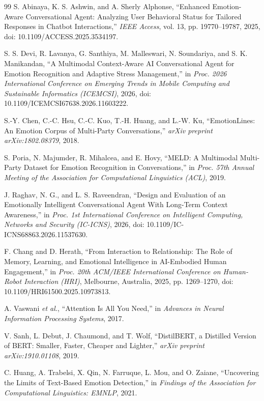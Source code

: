 \documentclass[graybox]{svmult}
\begin{document}
\begin{thebibliography}{99}
S. Abinaya, K. S. Ashwin, and A. Sherly Alphonse, ``Enhanced
Emotion-Aware Conversational Agent: Analyzing User Behavioral Status for
Tailored Responses in Chatbot Interactions,'' \textit{IEEE Access},
vol. 13, pp. 19770--19787, 2025,
doi: 10.1109/ACCESS.2025.3534197.

S. S. Devi, R. Lavanya, G. Santhiya, M. Malleswari, N. Soundariya, and
S. K. Manikandan, ``A Multimodal Context-Aware AI Conversational Agent
for Emotion Recognition and Adaptive Stress Management,'' in \textit{Proc.
2026 International Conference on Emerging Trends in Mobile Computing and
Sustainable Informatics (ICEMCSI)}, 2026,
doi: 10.1109/ICEMCSI67638.2026.11603222.

S.-Y. Chen, C.-C. Hsu, C.-C. Kuo, T.-H. Huang, and L.-W. Ku,
``EmotionLines: An Emotion Corpus of Multi-Party Conversations,''
\textit{arXiv preprint arXiv:1802.08379}, 2018.

S. Poria, N. Majumder, R. Mihalcea, and E. Hovy, ``MELD: A Multimodal
Multi-Party Dataset for Emotion Recognition in Conversations,'' in
\textit{Proc. 57th Annual Meeting of the Association for Computational
Linguistics (ACL)}, 2019.

J. Raghav, N. G., and L. S. Raveendran, ``Design and Evaluation of an
Emotionally Intelligent Conversational Agent With Long-Term Context
Awareness,'' in \textit{Proc. 1st International Conference on Intelligent
Computing, Networks and Security (IC-ICNS)}, 2026,
doi: 10.1109/IC-ICNS68863.2026.11537630.

F. Chang and D. Herath, ``From Interaction to Relationship: The Role of
Memory, Learning, and Emotional Intelligence in AI-Embodied Human
Engagement,'' in \textit{Proc. 20th ACM/IEEE International Conference on
Human-Robot Interaction (HRI)}, Melbourne, Australia, 2025,
pp. 1269--1270, doi: 10.1109/HRI61500.2025.10973813.

A. Vaswani \textit{et al.}, ``Attention Is All You Need,'' in
\textit{Advances in Neural Information Processing Systems}, 2017.

V. Sanh, L. Debut, J. Chaumond, and T. Wolf, ``DistilBERT, a Distilled
Version of BERT: Smaller, Faster, Cheaper and Lighter,'' \textit{arXiv
preprint arXiv:1910.01108}, 2019.

C. Huang, A. Trabelsi, X. Qin, N. Farruque, L. Mou, and O. Zaiane,
``Uncovering the Limits of Text-Based Emotion Detection,'' in
\textit{Findings of the Association for Computational Linguistics: EMNLP},
2021.

\end{thebibliography}
\end{document}
